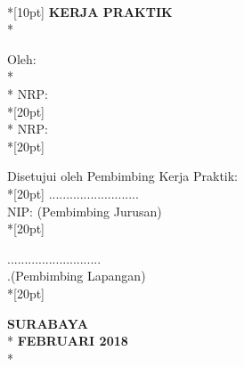 \newpage
	\thispagestyle{plain}
	\begin{centering}
		\textbf{\MakeUppercase{\judul}} \\*[10pt]
		\textbf{\large{KERJA PRAKTIK}} \\*
		
		Oleh: \\*
		\textbf{\penulis} \\*
		NRP: \nrp \\*[20pt]
		\textbf{\penulisDua} \\*
		NRP: \nrpDua \\*[20pt]
	\end{centering}

	{\noindent Disetujui oleh Pembimbing Kerja Praktik:}\\*[20pt]         
	\pembimbingJurusan \hfill \hfill .......................... \\
		NIP: \nipPembimbingSatu \hfill \hfill (Pembimbing Jurusan) \\*[20pt]
		
	{\noindent \pembimbingLapangan  \hfill \hfill ...........................}  \\
	.\hfill \hfill (Pembimbing Lapangan) \\*[20pt] 

	\begin{centering}
		\textbf{SURABAYA} \\*
		\textbf{FEBRUARI 2018} \\*
	\end{centering}
	\cleardoublepage